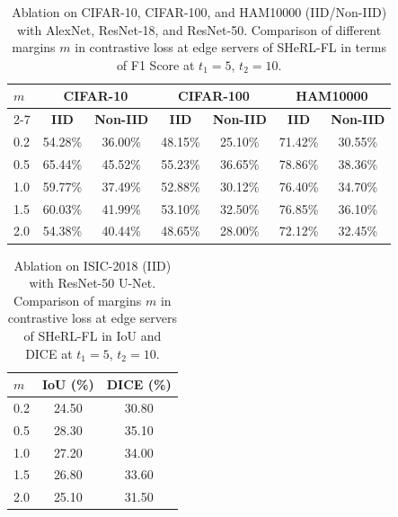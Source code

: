 \documentclass[letterpaper]{article} %
\begin{document}
        \begin{table}[!ht]
            \centering
            \begin{tabular}{l|cc|cc|cc}
                \hline
                \multirow{2}{*}{\textbf{$m$}} &
                \multicolumn{2}{c|}{\textbf{CIFAR-10}} &
                \multicolumn{2}{c|}{\textbf{CIFAR-100}} &
                \multicolumn{2}{c}{\textbf{HAM10000}} \\ \cline{2-7}
                 & \textbf{IID} & \textbf{Non-IID} & \textbf{IID} & \textbf{Non-IID} & \textbf{IID} & \textbf{Non-IID} \\
                \hline
                0.2 & 54.28\% & 36.00\% & 48.15\% & 25.10\% & 71.42\% & 30.55\% \\
                0.5 & 65.44\% & 45.52\% & 55.23\% & 36.65\% & 78.86\% & 38.36\% \\
                1.0 & 59.77\% & 37.49\% & 52.88\% & 30.12\% & 76.40\% & 34.70\% \\
                1.5 & 60.03\% & 41.99\% & 53.10\% & 32.50\% & 76.85\% & 36.10\% \\
                2.0 & 54.38\% & 40.44\% & 48.65\% & 28.00\% & 72.12\% & 32.45\% \\
                \hline
            \end{tabular}
            \caption{Ablation on CIFAR-10, CIFAR-100, and HAM10000 (IID/Non-IID) with AlexNet, ResNet-18, and ResNet-50. Comparison of different margins $m$ in contrastive loss at edge servers of SHeRL-FL in terms of F1 Score at $t_1=5$, $t_2=10$.}            \label{tab:margin_ablation}
        \end{table}
        \begin{table}[ht]
            \centering
            \begin{tabular}{l|c|c}
                \hline
                \centering\textbf{$m$} & \textbf{IoU (\%)} & \textbf{DICE (\%)} \\ \hline
                0.2 & 24.50 & 30.80 \\
                0.5 & 28.30 & 35.10 \\
                1.0 & 27.20 & 34.00 \\
                1.5 & 26.80 & 33.60 \\
                2.0 & 25.10 & 31.50 \\
                \hline
            \end{tabular}
            \caption{Ablation on ISIC-2018 (IID) with ResNet-50 U-Net. Comparison of margins $m$ in contrastive loss at edge servers of SHeRL-FL in IoU and DICE at $t_1=5$, $t_2=10$.}
            \label{tab:ablation_segmentation_margin}
        \end{table}
        
\end{document}
